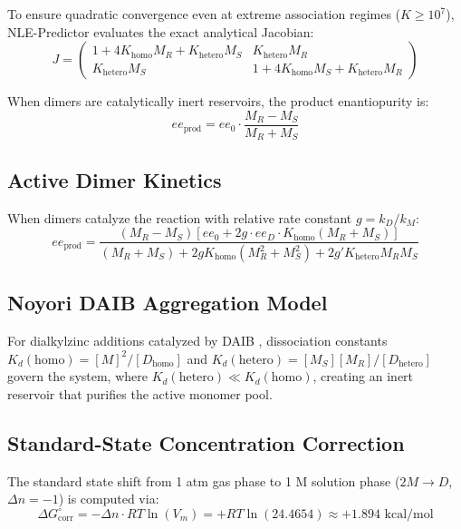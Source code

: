 \documentclass[11pt,a4paper]{article}
\begin{document}
To ensure quadratic convergence even at extreme association regimes ($K \ge 10^7$), NLE-Predictor evaluates the exact analytical Jacobian:
\begin{equation}
J = \begin{pmatrix}
1 + 4 K_{\text{homo}} M_R + K_{\text{hetero}} M_S & K_{\text{hetero}} M_R \\
K_{\text{hetero}} M_S & 1 + 4 K_{\text{homo}} M_S + K_{\text{hetero}} M_R
\end{pmatrix}
\end{equation}

When dimers are catalytically inert reservoirs, the product enantiopurity is:
\begin{equation}
ee_{\text{prod}} = ee_0 \cdot \frac{M_R - M_S}{M_R + M_S}
\end{equation}

\subsection{Active Dimer Kinetics}
When dimers catalyze the reaction with relative rate constant $g = k_D / k_M$:
\begin{equation}
ee_{\text{prod}} = \frac{(M_R - M_S) [ee_0 + 2 g \cdot ee_D \cdot K_{\text{homo}} (M_R + M_S)]}{(M_R + M_S) + 2 g K_{\text{homo}} (M_R^2 + M_S^2) + 2 g' K_{\text{hetero}} M_R M_S}
\end{equation}

\subsection{Noyori DAIB Aggregation Model}
For dialkylzinc additions catalyzed by DAIB \cite{Noyori1989}, dissociation constants $K_d(\text{homo}) = [M]^2 / [D_{\text{homo}}]$ and $K_d(\text{hetero}) = [M_S][M_R] / [D_{\text{hetero}}]$ govern the system, where $K_d(\text{hetero}) \ll K_d(\text{homo})$, creating an inert reservoir that purifies the active monomer pool.

\subsection{Standard-State Concentration Correction}
The standard state shift from 1 atm gas phase to 1 M solution phase ($2 M \to D$, $\Delta n = -1$) is computed via:
\begin{equation}
\Delta G^\circ_{\text{corr}} = -\Delta n \cdot RT \ln(V_m) = +RT \ln(24.4654) \approx +1.894 \text{ kcal/mol}
\end{equation}
\end{document}

